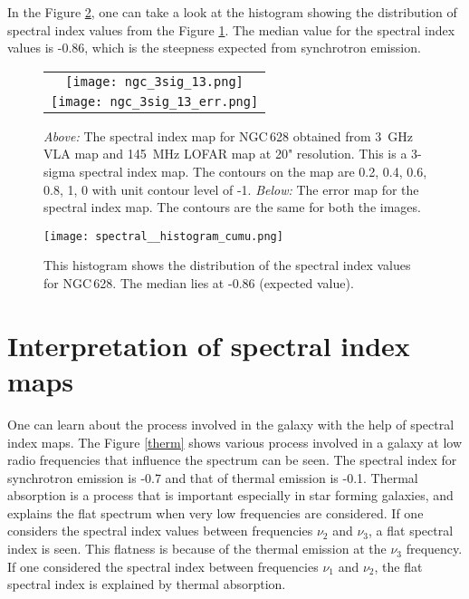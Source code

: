 \documentclass[../main/thesis_msc.tex]{subfiles}
\begin{document}
In the Figure \ref{ngcsi}, one can take a look at the histogram showing the distribution of spectral index values from the Figure \ref{ngc_spectr}. The median value for the spectral index values is -0.86, which is the steepness expected from synchrotron emission.

\begin{figure}
	\centering
    \begin{tabular}{@{}c@{}}
	\texttt{[image: ngc\_3sig\_13.png]} \\[\abovecaptionskip]
	\texttt{[image: ngc\_3sig\_13\_err.png]}\\[\abovecaptionskip]
	\end{tabular}
	\caption{\textit{Above:} The spectral index map for NGC\,628 obtained from 3~GHz VLA map and 145~MHz LOFAR map at 20" resolution. This is a 3-sigma spectral index map. The contours on the map are 0.2, 0.4, 0.6, 0.8, 1, 0 with unit contour level of -1. \textit{Below:} The error map for the spectral index map. The contours are the same for both the images.}
	\label{ngc_spectr}
\end{figure}

\begin{figure}
\centering
\texttt{[image: spectral\_\_histogram\_cumu.png]}
\caption{This histogram shows the distribution of the spectral index values for NGC\,628. The median lies at -0.86 (expected value).}
\label{ngcsi}
\end{figure}

\section{Interpretation of spectral index maps}

One can learn about the process involved in the galaxy with the help of spectral index maps. The Figure \ref{therm} shows various process involved in a galaxy at low radio frequencies that influence the spectrum can be seen. The spectral index for synchrotron emission is -0.7 and that of thermal emission is -0.1. Thermal absorption is a process that is important especially in star forming galaxies, and explains the flat spectrum when very low frequencies are considered. If one considers the spectral index values between frequencies $\nu_2$ and $\nu_3$, a flat spectral index is seen. This flatness is because of the thermal emission at the $\nu_3$ frequency. If one considered the spectral index between frequencies $\nu_1$ and $\nu_2$, the flat spectral index is explained by thermal absorption.
\end{document}

